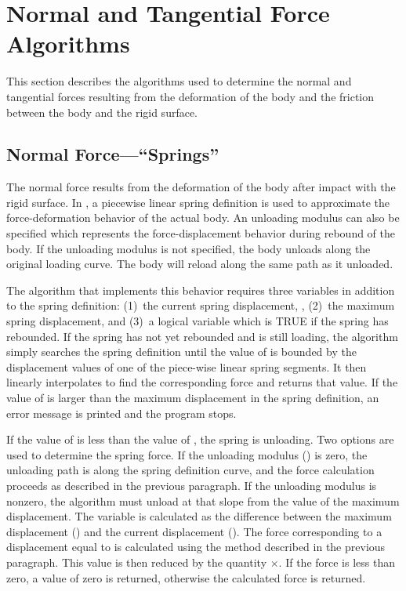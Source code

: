 \section{Normal and Tangential Force Algorithms}
This section describes the algorithms used to determine the normal and 
tangential forces resulting from the deformation of the body and the
friction between the body and the rigid surface.  

\subsection{Normal Force---``Springs''}
The normal force results from the deformation of the body after impact
with the rigid surface.  In \SLAP, a piecewise linear spring definition
is used to approximate the force-deformation behavior of the actual
body.  An unloading modulus can also be specified which represents the
force-displacement behavior during rebound of the body.  If the
unloading modulus is not specified, the body unloads along the original
loading curve.  The body will reload along the same path as it unloaded.

The algorithm that implements this behavior requires three variables in
addition to the spring definition: (1)~the current spring displacement,
, (2)~the maximum spring displacement,  and (3)~a
logical variable which is {\sf TRUE} if the spring has rebounded.  If
the spring has not yet rebounded and is still loading, the algorithm
simply searches the spring definition until the value of  is
bounded by the displacement values of one of the piece-wise linear spring
segments.  It then linearly interpolates to find the corresponding force
and returns that value.  If the value of  is larger than the
maximum displacement in the spring definition, an error message is
printed and the program stops.

If the value of  is less than the value of , the
spring is unloading.  Two options are used to determine the spring
force.  If the unloading modulus () is zero, the unloading
path is along the spring definition curve, and the force calculation
proceeds as described in the previous paragraph.  If the unloading
modulus is nonzero, the algorithm must unload at that slope from the
value of the maximum displacement.  The variable  is
calculated as the difference between the maximum displacement
() and the current displacement ().  The force
corresponding to a displacement equal to  is calculated
using the method described in the previous paragraph.  This value is
then reduced by the quantity $\times$.  If the
force is less than zero, a value of zero is returned, otherwise the
calculated force is returned. 

